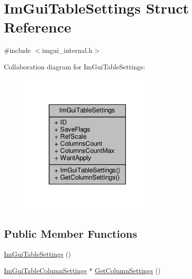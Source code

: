 \hypertarget{structImGuiTableSettings}{}\section{Im\+Gui\+Table\+Settings Struct Reference}
\label{structImGuiTableSettings}


{\ttfamily \#include $<$imgui\+\_\+internal.\+h$>$}



Collaboration diagram for Im\+Gui\+Table\+Settings\+:
\nopagebreak
\begin{figure}[H]
\begin{center}
\leavevmode
\includegraphics[width=198pt]{structImGuiTableSettings__coll__graph}
\end{center}
\end{figure}
\subsection*{Public Member Functions}
\begin{DoxyCompactItemize}
\item 
\hyperlink{structImGuiTableSettings_ae40bd13d3f4d1bde0d46fe12a0628777}{Im\+Gui\+Table\+Settings} ()
\item 
\hyperlink{structImGuiTableColumnSettings}{Im\+Gui\+Table\+Column\+Settings} $\ast$ \hyperlink{structImGuiTableSettings_ad5bc9a71db18b61d9940c14aec13762d}{Get\+Column\+Settings} ()
\end{DoxyCompactItemize}
